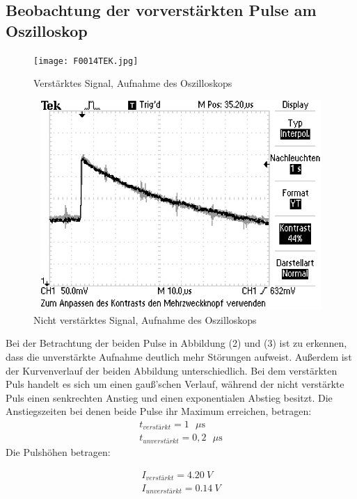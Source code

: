 \documentclass{article}
\begin{document}
\subsection{Beobachtung  der vorverstärkten Pulse am Oszilloskop}

\begin{figure}[H]
	\centering
	\texttt{[image: F0014TEK.jpg]}
	\caption{ Verstärktes Signal, Aufnahme des Oszilloskops}
	\label{fig: abb. 1}
\end{figure} 
	
	\begin{figure}[H]
	
	\centering
	\includegraphics[height=8cm,width=12cm]{F0017TEK.jpg}
	\caption{ Nicht verstärktes Signal, Aufnahme des Oszilloskops}
	\label{fig: abb. 1}
	
	
\end{figure} 

Bei der Betrachtung der beiden Pulse in Abbildung (2) und (3) ist zu erkennen, dass die unverstärkte Aufnahme deutlich mehr Störungen aufweist. Außerdem ist der Kurvenverlauf der beiden Abbildung unterschiedlich. Bei dem verstärkten Puls handelt es sich um einen gauß'schen Verlauf, während der nicht verstärkte Puls einen senkrechten Anstieg und einen exponentialen Abstieg besitzt. Die Anstiegszeiten bei denen beide Pulse ihr Maximum erreichen, betragen: 
\begin{align*}
t_{verstärkt}=1 \text{ $\mu$s} \\
t_{unverstärkt}= 0,2\text{ $\mu$s} 
\end{align*}
Die Pulshöhen betragen:

\begin{align*}
I_{verstärkt}=\SI{4,20}{V}\\
I_{unverstärkt}=\SI{0,14}{V}
\end{align*}
\end{document}
